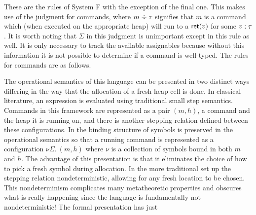 These are the rules of System F with the exception of the final
one. This makes use of the judgment for commands, where
$m \mathrel{\div} \tau$ signifies that $m$ is a command which (when executed
on the appropriate heap) will run to a $\mathsf{ret}(v)$ for some
$v \mathrel{:} \tau$. It is worth noting that $\Sigma$ in this judgment is
unimportant except in this rule as well. It is only necessary to track
the available assignables because without this information it is not
possible to determine if a command is well-typed. The rules for
commands are as follows.
The operational semantics of this language can be presented in two
distinct ways differing in the way that the allocation of a fresh heap
cell is done. In classical literature, an expression is evaluated
using traditional small step semantics. Commands in this framework are
represented as a pair $(m, h)$, a command and the heap it is running
on, and there is another stepping relation defined between these
configurations. In \citet{Harper:16} the binding structure of symbols
is preserved in the operational semantics so that a running command is
represented as a configuration $\nu \Sigma.\ (m, h)$ where $\nu$ is a
collection of symbols bound in both $m$ and $h$. The advantage of this
presentation is that it eliminates the choice of how to pick a fresh
symbol during allocation. In the more traditional set up the stepping
relation nondeterministic, allowing for any fresh location to be
chosen. This nondeterminism complicates many metatheoretic properties
and obscures what is really happening since the language is
fundamentally not nondeterministic! The formal presentation has just
